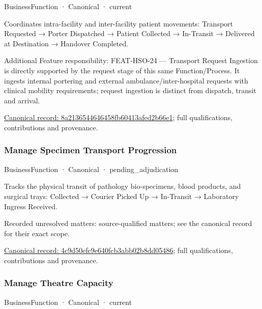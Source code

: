 \label{element:8a2136544646458fb60413afed2b66e1}
{\small BusinessFunction · Canonical · current}\par

Coordinates intra-facility and inter-facility patient movements: Transport Requested → Porter Dispatched → Patient Collected → In-Transit → Delivered at Destination → Handover Completed.



Additional Feature responsibility: FEAT-HSO-24 — Transport Request Ingestion is directly supported by the request stage of this same Function/Process. It ingests internal portering and external ambulance/inter-hospital requests with clinical mobility requirements; request ingestion is distinct from dispatch, transit and arrival.


{\footnotesize \href{../../../../continuum/business/business-function/8a2136544646458fb60413afed2b66e1.md}{Canonical record: 8a2136544646458fb60413afed2b66e1}; full qualifications, contributions and provenance.}\par
\subsubsection{Manage Specimen Transport Progression}

\label{element:4c9d50efc9e640fcb3abb02b8dd05486}
{\small BusinessFunction · Canonical · pending\_adjudication}\par

Tracks the physical transit of pathology bio-specimens, blood products, and surgical trays: Collected → Courier Picked Up → In-Transit → Laboratory Ingress Received.


{\small Recorded unresolved matters: source-qualified matters; see the canonical record for their exact scope.}\par
{\footnotesize \href{../../../../continuum/business/business-function/4c9d50efc9e640fcb3abb02b8dd05486.md}{Canonical record: 4c9d50efc9e640fcb3abb02b8dd05486}; full qualifications, contributions and provenance.}\par
\subsubsection{Manage Theatre Capacity}

\label{element:3566d549770f490dba823fe3b0421446}
{\small BusinessFunction · Canonical · current}\par

